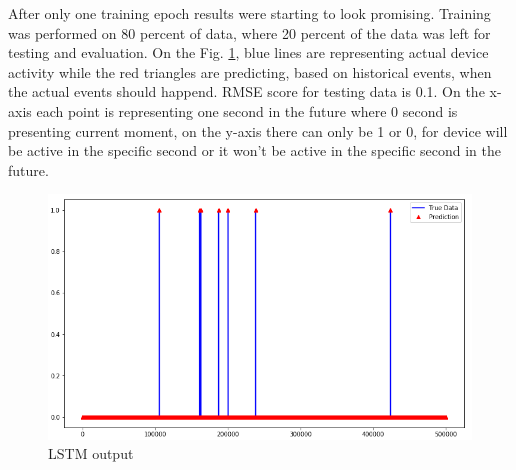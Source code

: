 \documentclass[11pt, a4paper]{article} %
\begin{document}
After only one training epoch results were starting to look promising. 
Training was performed on 80 percent of data, where 20 percent of the data was left for testing and evaluation.
On the Fig. \ref{lstm-out}, blue lines are representing actual device activity while the red triangles are predicting, based on historical events, when the actual events should happend. RMSE score for testing data is 0.1.
On the x-axis each point is representing one second in the future where 0 second is presenting current moment, on the y-axis there can only be 1 or 0, for device will be active in the specific second or it won't be active in the specific second in the future.
\begin{figure}
	\centering
	\includegraphics[scale=.6]{images/lstm-out.png} %
	\caption{LSTM output}
	\label{lstm-out} 
\end{figure}
\end{document}
